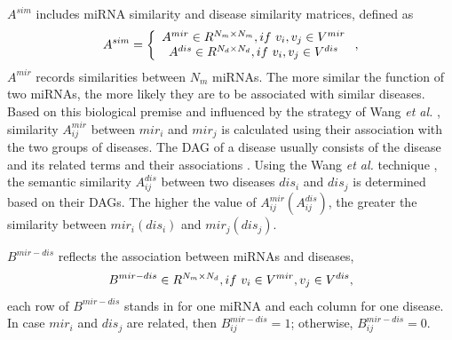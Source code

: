 \documentclass[journal,twoside,web]{ieeecolor}
\begin{document}
${A^{sim}}$ includes miRNA similarity and disease similarity matrices, defined as
\begin{equation}
{A^{sim}} = \left\{ {\begin{array}{*{20}{c}}
{{A^{mir}} \in {R^{{N_m} \times {N_m}}},{\rm{ }}if{\ \rm{  }}{\rm{  }}{\rm{  }}{v_i},{v_j} \in {V^{mir}}}\\
{{A^{dis}} \in {R^{{N_d} \times {N_d}}},{\rm{ }}if{\ \rm{  }}{\rm{  }}{\rm{  }}{v_i},{v_j} \in {V^{dis}}}\\
\end{array}} \right.,
\end{equation}
${A^{mir}}$ records similarities between ${N_m}$ miRNAs. The more similar the function of two miRNAs, the more likely they are to be associated with similar diseases. Based on this biological premise and influenced by the strategy of Wang {\it et al.} \cite{2010Inferring}, similarity $A_{ij}^{mir}$ between $mi{r_i}$ and $mi{r_j}$ is calculated using their association with the two groups of diseases. The DAG of a disease usually consists of the disease and its related terms and their associations \cite{2010Inferring}. Using the Wang {\it et al.} technique \cite{2010Inferring}, the semantic similarity $A_{ij}^{dis}$ between two diseases $di{s_i}$ and $di{s_j}$ is determined based on their DAGs. The higher the value of $A_{ij}^{mir}\left( {A_{ij}^{dis}} \right)$, the greater the similarity between $mi{r_i}\left( {di{s_i}} \right)$ and $mi{r_j}\left( {di{s_j}} \right)$.

${B^{mir - dis}}$ reflects the association between miRNAs and diseases,
\begin{equation}
B^{mir - dis}\in {R^{{N_m} \times {N_d}}},{\rm{ }}if{\ \rm{  }}{\rm{  }}{\rm{  }}{v_i} \in {V^{mir}},{\rm{ }}{v_j} \in {V^{dis}},
\end{equation}
each row of ${B^{mir - dis}}$ stands in for one miRNA and each column for one disease. In case $mi{r_i}$ and $di{s_j}$ are related, then $B_{ij}^{mir - dis} = 1$; otherwise, $B_{ij}^{mir - dis} = 0$.
\end{document}

